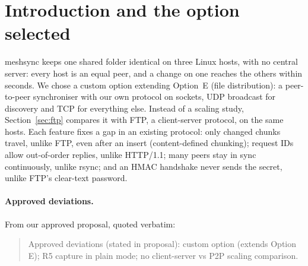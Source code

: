 \vspace{0.6pt}
\section{Introduction and the option selected}
\label{sec:intro}

meshsync keeps one shared folder identical on three Linux hosts, with no central server: every
host is an equal peer, and a change on one reaches the others within seconds. We chose a custom
option extending Option~E (file distribution): a peer-to-peer synchroniser with our own protocol on
sockets, UDP broadcast for discovery and TCP for everything else. Instead of a scaling study,
Section~\ref{sec:ftp} compares it with FTP, a client-server protocol, on the same hosts. Each
feature fixes a gap in an existing protocol: only changed chunks travel, unlike FTP, even after an
insert (content-defined chunking); request IDs allow out-of-order replies, unlike HTTP/1.1; many peers
stay in sync continuously, unlike rsync; and an HMAC handshake never sends the secret, unlike FTP's
clear-text password.

\paragraph{Approved deviations.} From our approved proposal, quoted verbatim:

\begin{quote}
Approved deviations (stated in proposal): custom option (extends Option E); R5 capture in plain
mode; no client-server vs P2P scaling comparison.
\end{quote}
